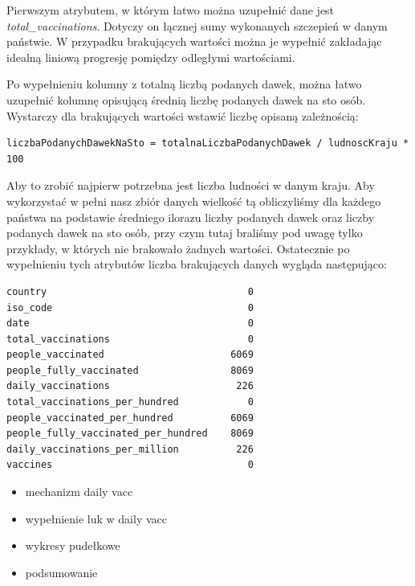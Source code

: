 \documentclass[12pt, oneside]{article}
\begin{document}
Pierwszym atrybutem, w którym łatwo można uzupełnić dane jest \textit{total\_vaccinations}. Dotyczy on łącznej sumy wykonanych szczepień w danym państwie. W przypadku brakujących wartości można je wypełnić zakładając idealną liniową progresję pomiędzy odległymi wartościami.

Po wypełnieniu kolumny z totalną liczbą podanych dawek, można łatwo uzupełnić kolumnę opisującą średnią liczbę podanych dawek na sto osób. Wystarczy dla brakujących wartości wstawić liczbę opisaną zależnością:
\begin{verbatim}
liczbaPodanychDawekNaSto = totalnaLiczbaPodanychDawek / ludnoscKraju * 100 
\end{verbatim}

Aby to zrobić najpierw potrzebna jest liczba ludności w danym kraju. Aby wykorzystać w pełni nasz zbiór danych wielkość tą obliczyliśmy dla każdego państwa na podstawie średniego ilorazu liczby podanych dawek oraz liczby podanych dawek na sto osób, przy czym tutaj braliśmy pod uwagę tylko przykłady, w których nie brakowało żadnych wartości. Ostatecznie po wypełnieniu tych atrybutów liczba brakujących danych wygląda następująco:
\begin{verbatim}
country                                   0
iso_code                                  0
date                                      0
total_vaccinations                        0
people_vaccinated                      6069
people_fully_vaccinated                8069
daily_vaccinations                      226
total_vaccinations_per_hundred            0
people_vaccinated_per_hundred          6069
people_fully_vaccinated_per_hundred    8069
daily_vaccinations_per_million          226
vaccines                                  0
\end{verbatim}


\begin{itemize}
\item mechanizm daily vacc
\item wypełnienie luk w daily vacc
\item wykresy pudełkowe
\item podsumowanie
\end{itemize}
\end{document}
